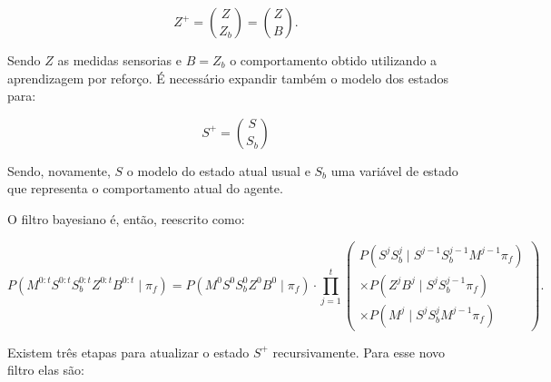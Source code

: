 \begin{equation}
	Z^+ = \binom{Z}{Z_b} = \binom{Z}{B}.
\end{equation}

Sendo $ Z $ as medidas sensorias e $ B = Z_b $ o comportamento obtido utilizando a aprendizagem por reforço. É necessário expandir também o modelo dos estados para:

\begin{equation}
	S^+ = \binom{S}{S_b}
\end{equation}

Sendo, novamente, $ S $ o modelo do estado atual usual e $ S_b $ uma variável de estado que representa o comportamento atual do agente.

O filtro bayesiano é, então, reescrito como:

\begin{equation}
        P \left( M^{0: t} S^{0: t} S_b^{0: t} Z^{0: t} B^{0: t} \mid \pi_f \right) = P \left( M^0 S^0 S_b^0 Z^0 B^0 \mid \pi_f \right) \cdot \prod\limits_{j =1}^{t} 
        \left(
            \begin{array}{l}
                P \left( S^j S_b^j \mid S^{j -1} S_b^{j-1} M^{j -1} \pi_f \right) \\
                \times P \left( Z^j B^j \mid S^j S_b^{j-1} \pi_f \right) \\
                \times P \left( M^j \mid S^j S_b^j M^{j -1} \pi_f \right)
            \end{array}
        \right).
\end{equation}

Existem três etapas para atualizar o estado $ S^+ $ recursivamente. Para esse novo filtro elas são:

